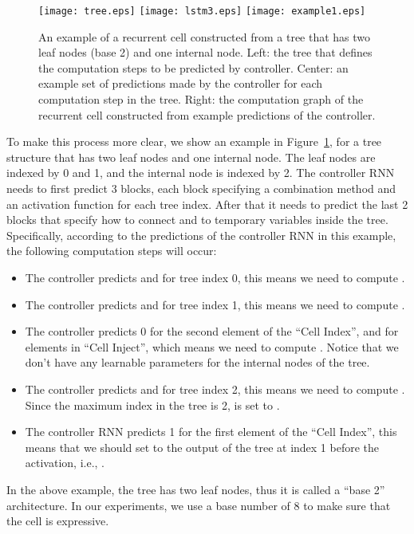 \documentclass{article} \usepackage{iclr2017_conference,times}
\begin{document}
\begin{figure}[h!]
\begin{center}
\texttt{[image: tree.eps]}
\texttt{[image: lstm3.eps]}
\texttt{[image: example1.eps]}
\caption{An example of a recurrent cell constructed from a tree that has two leaf nodes (base 2) and one internal node. Left: the tree that defines the computation steps to be predicted by controller. Center: an example set of predictions made by the controller for each computation step in the tree.  Right: the computation graph of the recurrent cell constructed from example predictions of the controller. }
\label{figure:RNN_Method}
\end{center}
\end{figure} 
To make this process more clear, we show an example in Figure~\ref{figure:RNN_Method}, for a tree structure that has two leaf nodes and one internal node. The leaf nodes are indexed by 0 and 1, and the internal node is indexed by 2. The controller RNN needs to first predict 3 blocks, each block specifying a combination method and an activation function for each tree index. After that it needs to predict the last 2 blocks that specify how to connect  and  to temporary variables inside the tree. Specifically, according to the predictions of the controller RNN in this example, the following computation steps will occur:
\begin{itemize}
\item The controller predicts  and  for tree index 0, this means we need to compute . 
\item The controller predicts  and  for tree index 1, this means we need to compute . 
\item The controller predicts 0 for the second element of the ``Cell Index'',  and  for elements in ``Cell Inject'', which means we need to compute . Notice that we don't have any learnable parameters for the internal nodes of the tree.
\item The controller predicts  and  for tree index 2, this means we need to compute . Since the maximum index in the tree is 2,  is set to .
\item The controller RNN predicts 1 for the first element of the ``Cell Index'', this means that we should set  to the output of the tree at index 1 before the activation, i.e., .
\end{itemize}



In the above example, the tree has two leaf nodes, thus it is called a ``base 2'' architecture. In our experiments, we use a base number of 8 to make sure that the cell is expressive. 
\end{document}
